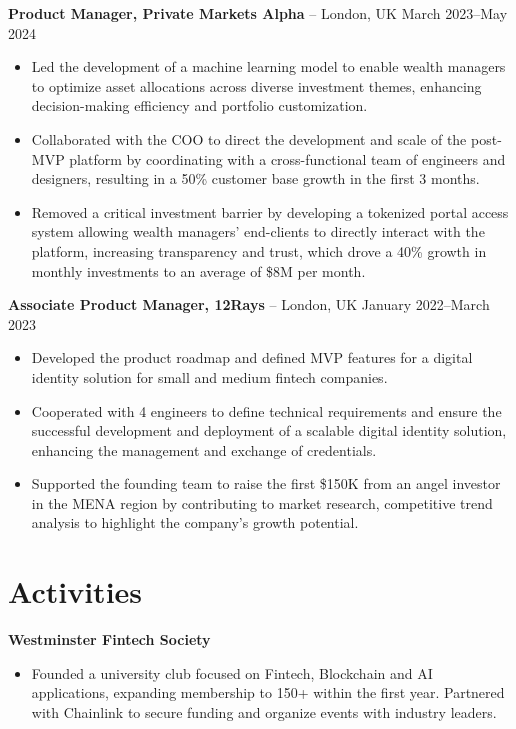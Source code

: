 \documentclass{article}
\begin{document}
\textbf{Product Manager, Private Markets Alpha} -- London, UK \hfill March 2023--May 2024
\begin{itemize}[leftmargin=*,noitemsep,topsep=0pt]
    \item Led the development of a machine learning model to enable wealth managers to optimize asset allocations across diverse investment themes, enhancing decision-making efficiency and portfolio customization.
    \item Collaborated with the COO to direct the development and scale of the post-MVP platform by coordinating with a cross-functional team of engineers and designers, resulting in a 50\% customer base growth in the first 3 months.
    \item Removed a critical investment barrier by developing a tokenized portal access system allowing wealth managers' end-clients to directly interact with the platform, increasing transparency and trust, which drove a 40\% growth in monthly investments to an average of \$8M per month.
\end{itemize}

\textbf{Associate Product Manager, 12Rays} -- London, UK \hfill January 2022--March 2023
\begin{itemize}[leftmargin=*,noitemsep,topsep=0pt]
    \item Developed the product roadmap and defined MVP features for a digital identity solution for small and medium fintech companies.
    \item Cooperated with 4 engineers to define technical requirements and ensure the successful development and deployment of a scalable digital identity solution, enhancing the management and exchange of credentials.
    \item Supported the founding team to raise the first \$150K from an angel investor in the MENA region by contributing to market research, competitive trend analysis to highlight the company's growth potential.
\end{itemize}

\section*{Activities}
\textbf{Westminster Fintech Society}
\begin{itemize}[leftmargin=*,noitemsep,topsep=0pt]
    \item Founded a university club focused on Fintech, Blockchain and AI applications, expanding membership to 150+ within the first year. Partnered with Chainlink to secure funding and organize events with industry leaders.
\end{itemize}
\end{document}
